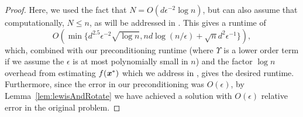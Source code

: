 \begin{proof}
	Here, we used the fact that $N = O(d\epsilon^{-2}\log{n})$, but can also assume that computationally, $N \leq n$, as will be addressed in . This gives a runtime of 
	\[
	O\left(\min\{d^{2.5} \epsilon^{-2} \sqrt{\log {n}} , nd\log (n/\epsilon) + \sqrt{n}d^2\epsilon^{-1} \}\right),
	\] which, combined with our preconditioning runtime (where $\Upsilon$ is a lower order term if we assume the $\epsilon$ is at most polynomially small in $n$) and the factor $\log{n}$ overhead from estimating $f(\boldsymbol{\mathit{x}}^*)$ which we address in , gives the desired runtime. Furthermore, since the error in our preconditioning was $O(\epsilon)$, by Lemma~\ref{lem:lewisAndRotate} we have achieved a solution with $O(\epsilon)$ relative error in the original problem.
\end{proof}

%